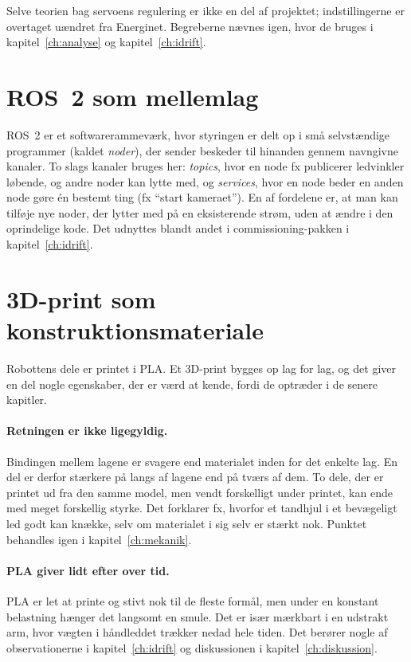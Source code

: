 Selve teorien bag servoens regulering er ikke en del af projektet;
indstillingerne er overtaget uændret fra Energinet. Begreberne
nævnes igen, hvor de bruges i kapitel~\ref{ch:analyse} og
kapitel~\ref{ch:idrift}.

\section{ROS~2 som mellemlag}
\label{sec:teori-kommunikation}

ROS~2 er et softwarerammeværk, hvor styringen er delt op i små
selvstændige programmer (kaldet \emph{noder}), der sender beskeder
til hinanden gennem navngivne kanaler. To slags kanaler bruges
her: \emph{topics}, hvor en node fx publicerer ledvinkler løbende,
og andre noder kan lytte med, og \emph{services}, hvor en node
beder en anden node gøre én bestemt ting (fx \enquote{start
kameraet}). En af fordelene er, at man kan tilføje nye noder, der
lytter med på en eksisterende strøm, uden at ændre i den oprindelige
kode. Det udnyttes blandt andet i commissioning-pakken i
kapitel~\ref{ch:idrift}.

\clearpage
\section{3D-print som konstruktionsmateriale}
\label{sec:teori-3dprint}

Robottens dele er printet i PLA. Et 3D-print bygges op lag for
lag, og det giver en del nogle egenskaber, der er værd at kende,
fordi de optræder i de senere kapitler.

\paragraph{Retningen er ikke ligegyldig.}
Bindingen mellem lagene er svagere end materialet inden for det
enkelte lag. En del er derfor stærkere på langs af lagene end på
tværs af dem. To dele, der er printet ud fra den samme model, men
vendt forskelligt under printet, kan ende med meget forskellig
styrke. Det forklarer fx, hvorfor et tandhjul i et bevægeligt led
godt kan knække, selv om materialet i sig selv er stærkt nok.
Punktet behandles igen i kapitel~\ref{ch:mekanik}.

\paragraph{PLA giver lidt efter over tid.}
PLA er let at printe og stivt nok til de fleste formål, men under
en konstant belastning hænger det langsomt en smule. Det er især
mærkbart i en udstrakt arm, hvor vægten i håndleddet trækker nedad
hele tiden. Det berører nogle af observationerne i
kapitel~\ref{ch:idrift} og diskussionen i
kapitel~\ref{ch:diskussion}.

